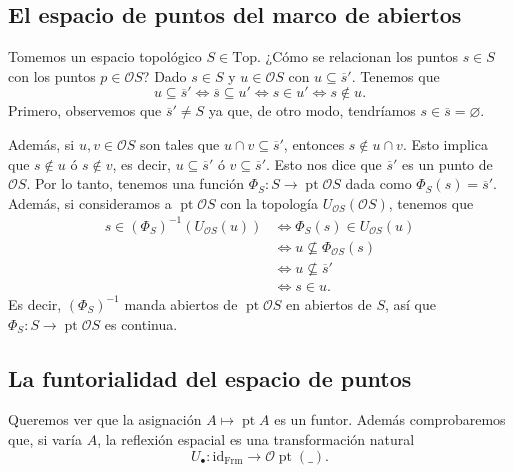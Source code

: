 \documentclass[12pt,letterpaper,titlepage]{article}
\let\emptyset\varnothing
\theoremstyle{definition}
\newcommand\ol[1]{\overline{#1}}
\renewcommand\cal[1]{\mathcal{#1}}
\newcommand\<{\langle}
\renewcommand\>{\rangle}
\newcommand{\Frm}{\mathrm{Frm}}
\newcommand{\Top}{\mathrm{Top}}
\newcommand{\id}{\mathrm{id}}
\DeclareMathOperator{\pt}{pt}
\begin{document}
\subsection{El espacio de puntos del marco de abiertos}
Tomemos un espacio topológico $S\in\Top$.
¿Cómo se relacionan los puntos $s\in S$ con los puntos $p\in\cal OS$?
Dado $s\in S$ y $u\in\cal OS$ con $u\subseteq \overline{s}'$. Tenemos que
\[u\subseteq \overline{s}' \iff \overline{s}\subseteq u' \iff s\in u' \iff s\notin u.\]
Primero, observemos que $\overline{s}'\neq S$ ya que, de otro modo,
tendríamos $s\in\ol{s}=\emptyset$.\par 
Además, si $u,v\in \cal OS$ son tales que
$u\cap v\subseteq \ol{s}'$, entonces $s\notin u\cap v$.
Esto implica que $s\notin u$ ó $s\notin v$, es decir, $u\subseteq \ol{s}'$ ó $v\subseteq \ol{s}'$.
Esto nos dice que $\ol{s}'$ es un punto de $\cal OS$.
Por lo tanto, tenemos una función $\Phi_S:S\to\pt\cal OS$ dada
como $\Phi_S(s) = \ol{s}'$.
Además, si consideramos a $\pt\cal OS$ con la topología
$U_{\cal OS}(\cal OS)$, tenemos que
\begin{align*}
    s\in (\Phi_S)^{-1}(U_{\cal OS}(u))
    &\iff \Phi_S(s) \in U_{\cal OS}(u) \\
    &\iff u \nsubseteq \Phi_{\cal OS}(s) \\
    &\iff u \nsubseteq \ol{s}' \\
    &\iff s\in u.
\end{align*}
Es decir, $(\Phi_S)^{-1}$ manda abiertos de $\pt\cal OS$ en abiertos
de $S$, así que $\Phi_S:S\to\pt\cal OS$ es continua.

\subsection{La funtorialidad del espacio de puntos}
Queremos ver que la asignación $A\mapsto \pt A$ es un funtor.
Además comprobaremos que, si varía $A$, la reflexión espacial
es una transformación natural
\[U_\bullet:\id_{\Frm}\to\cal O\pt(\_).\]
\end{document}

